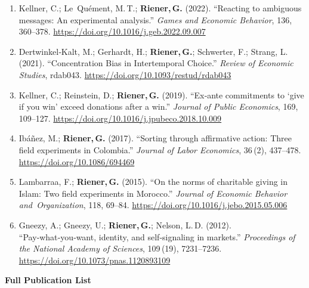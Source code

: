 \documentclass[10pt,A4]{article}
\providecommand{\tightlist}{\setlength{\itemsep}{0pt}\setlength{\parskip}{0pt}}
\newcommand{\cvsection}[1]
{
	\begin{center}
		\large\textcolor{sectcol}{\textbf{#1}}
	\end{center}
}
\begin{document}
\begin{enumerate}
\def\labelenumi{\arabic{enumi}.}
\tightlist
\item
  Kellner, C.; Le~Quément, M.\,T.; \textbf{Riener,\,G.} (2022).
  ``Reacting to ambiguous messages: An experimental analysis.''
  \emph{Games and Economic Behavior}, 136, 360--378.
  \url{https://doi.org/10.1016/j.geb.2022.09.007}\\
\item
  Dertwinkel‑Kalt, M.; Gerhardt, H.; \textbf{Riener,\,G.}; Schwerter,
  F.; Strang, L. (2021). ``Concentration Bias in Intertemporal Choice.''
  \emph{Review of Economic Studies}, rdab043.
  \url{https://doi.org/10.1093/restud/rdab043}\\
\item
  Kellner, C.; Reinstein, D.; \textbf{Riener,\,G.} (2019). ``Ex‑ante
  commitments to `give if you win' exceed donations after a win.''
  \emph{Journal of Public Economics}, 169, 109--127.
  \url{https://doi.org/10.1016/j.jpubeco.2018.10.009}\\
\item
  Ibáñez, M.; \textbf{Riener,\,G.} (2017). ``Sorting through affirmative
  action: Three field experiments in Colombia.'' \emph{Journal of Labor
  Economics}, 36\,(2), 437--478. \url{https://doi.org/10.1086/694469}\\
\item
  Lambarraa, F.; \textbf{Riener,\,G.} (2015). ``On the norms of
  charitable giving in Islam: Two field experiments in Morocco.''
  \emph{Journal of Economic Behavior and~Organization}, 118, 69--84.
  \url{https://doi.org/10.1016/j.jebo.2015.05.006}\\
\item
  Gneezy, A.; Gneezy, U.; \textbf{Riener,\,G.}; Nelson, L.\,D. (2012).
  ``Pay‑what‑you‑want, identity, and self‑signaling in markets.''
  \emph{Proceedings of the National Academy of Sciences}, 109\,(19),
  7231--7236. \url{https://doi.org/10.1073/pnas.1120893109}
\end{enumerate}

\cvsection{Full Publication List}
\end{document}
